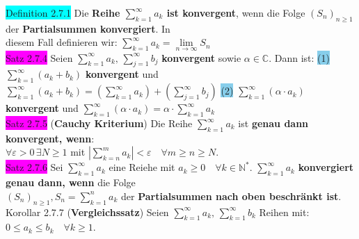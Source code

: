 \documentclass[10pt]{article}
\begin{document}
\colorbox{cyan}{Definition 2.7.1} Die \textbf{Reihe $\sum_{k=1}^\infty a_k$ ist konvergent}, 
                wenn die Folge \textcolor{NavyBlue}{$(S_n)_{n\geqslant1}$} 
                der \textbf{Partialsummen konvergiert}. In \\
        \indent diesem Fall definieren wir: 
                \textcolor{NavyBlue}{
                $\sum_{k=1}^\infty a_k=\lim\limits_{n\to\infty}S_n$}\\
\colorbox{magenta}{Satz 2.7.4} Seien 
                \textcolor{NavyBlue}{$\sum_{k=1}^\infty a_k,\,\sum_{j=1}^\infty b_j$} 
                \textbf{konvergent} sowie \textcolor{NavyBlue}{$\alpha\in\mathbb{C}$}. 
                Dann ist:
                \colorbox{SkyBlue}{(1)} 
                \textcolor{NavyBlue}{$\sum_{k=1}^\infty(a_k+b_k)$} 
                \textbf{konvergent} und \\
        \indent \textcolor{NavyBlue}{
                $\sum_{k=1}^\infty(a_k+b_k)=(\sum_{k=1}^\infty a_k)+(\sum_{j=1}^\infty b_j)$}
                \colorbox{SkyBlue}{(2)} 
                \textcolor{NavyBlue}{$\sum_{k=1}^\infty(\alpha\cdot a_k)$} 
                \textbf{konvergent} und 
                \textcolor{NavyBlue}{
                $\sum_{k=1}^\infty(\alpha\cdot a_k)=\alpha\cdot\sum_{k=1}^\infty a_k$}\\
\colorbox{magenta}{Satz 2.7.5} (\textbf{Cauchy Kriterium}) Die Reihe 
                \textcolor{NavyBlue}{$\sum_{k=1}^\infty a_k$ }
                ist \textbf{genau dann konvergent, wenn}:\\
        \indent \textcolor{NavyBlue}{$\forall\varepsilon >0\,\exists N\geqslant1$} mit 
                \textcolor{NavyBlue}{
                $|\sum_{k=n}^m a_k|<\varepsilon\quad\forall m\geqslant n\geqslant N$}. \\
\colorbox{magenta}{Satz 2.7.6} Sei \textcolor{NavyBlue}{$\sum_{k=1}^\infty a_k$} 
                eine Reiehe mit \textcolor{NavyBlue}{
                $a_k\geqslant0\quad\forall k\in\mathbb{N}^*$. $\sum_{k=1}^\infty a_k$}
                \textbf{konvergiert genau dann, wenn} die Folge \\
        \indent \textcolor{NavyBlue}{$(S_n)_{n\geqslant1},S_n=\sum_{k=1}^n a_k$} 
                der \textbf{Partialsummen nach oben beschränkt ist}.\\
\colorbox{BurntOrange}{Korollar 2.7.7} (\textbf{Vergleichssatz}) Seien 
                \textcolor{NavyBlue}{$\sum_{k=1}^\infty a_k,\,\sum_{k=1}^\infty b_k$} 
                Reihen mit: 
                \textcolor{NavyBlue}{$0\leqslant a_k\leqslant b_k\quad\forall k\geqslant1$}. 
\end{document}
